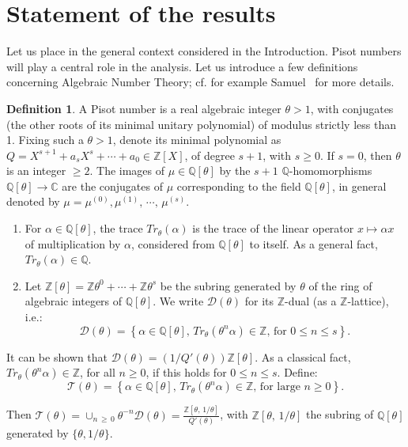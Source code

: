 \documentclass[10pt]{amsart}
\theoremstyle{definition}\newtheorem{defi}[theo]{Definition}\newtheorem{rema}[theo]{Remark}\newtheorem{exam}[theo]{Example}\newtheorem{exem}[theo]{Example}\newtheorem{nota}[theo]{Notation}
\newcommand{\Cbb}{\mathbb C}
\newcommand{\Qbb}{\mathbb Q}
\newcommand{\Zbb}{\mathbb Z}
\newcommand{\Dcl}{\mathcal{D}}
\newcommand{\Tcl}{\mathcal{T}}
\newcommand*{\romanenumi}{\renewcommand*{\theenumi}{\roman{enumi}}}
\begin{document}
\section{Statement of the results}\label{sect2}

Let us place in the general context considered in the Introduction. Pisot numbers will play a central role in the analysis. Let us introduce a few definitions concerning Algebraic Number Theory; cf. for example Samuel~\cite{samuel} for more details.


\begin{defi}
A Pisot number is a real algebraic integer $\theta>1$, with conjugates (the other roots of its minimal unitary polynomial) of modulus strictly less than 1. Fixing such a $\theta>1$, denote its minimal polynomial as $Q=X^{s+1}+a_sX^s+\cdots+a_0\in\Zbb[X]$, of degree $s+1$, with $s\geq0$. If $s=0$, then $\theta$ is an integer $\geq2$. The images of $\mu\in\Qbb[\theta]$ by the $s+1$ $\Qbb$-homomorphisms $\Qbb[\theta]\rightarrow\Cbb$ are the conjugates of $\mu$ corresponding to the field $\Qbb[\theta]$, in general denoted by $\mu=\mu^{(0)},\mu^{(1)},\,\cdots,\,\mu^{(s)}$.

\begin{enumerate}\romanenumi
\item \label{defi2.1.1}For $\alpha\in\Qbb[\theta]$, the trace $Tr_{\theta}(\alpha)$ is the trace of the linear operator $x\longmapsto \alpha x$ of multiplication by $\alpha$, considered from $\Qbb[\theta]$ to itself. As a general fact, $Tr_{\theta}(\alpha)\in\Qbb$.


\item \label{defi2.1.2}Let $\Zbb[\theta]=\Zbb\theta^0+\cdots+\Zbb\theta^s$ be the subring generated by $\theta$ of the ring of algebraic integers of $\Qbb[\theta]$. We write ${\Dcl}(\theta)$ for its $\Zbb$-dual (as a $\Zbb$-lattice), i.e.:
\[
\Dcl(\theta)=\left\{\alpha\in \Qbb[\theta],\,Tr_{\theta}(\theta^n\alpha)\in\Zbb\text{, for }0\leq n\leq s\right\}.
\]
\end{enumerate}

It can be shown that ${\Dcl}(\theta)=(1/Q'(\theta))\Zbb[\theta]$. As a classical fact, $Tr_{\theta}(\theta^n\alpha)\in\Zbb$, for all $n\geq0$, if this holds for $0\leq n\leq s$. Define:
\[
\Tcl(\theta)=\left\{\alpha\in\Qbb[\theta],\,Tr_{\theta}(\theta^n\alpha)\in\Zbb\text{, for large }n\geq0\right\}.
\]


Then $\Tcl(\theta)=\cup_{n\,\geq\,0}\theta^{-n}{\Dcl}(\theta)=\tfrac{\Zbb[\theta,\,1/\theta]}{Q'(\theta)}$, with $\Zbb[\theta,\,1/\theta]$ the subring of $\Qbb[\theta]$ generated by $\{\theta,1/\theta\}$.
\end{defi}
\end{document}
